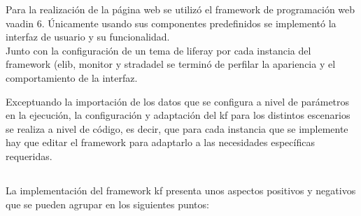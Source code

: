 Para la realización de la página web se utilizó el \gls{framework} de programación web  \gls{vaadin} 6. Únicamente usando sus componentes predefinidos se implementó la interfaz de usuario y su funcionalidad.\\

Junto con la configuración de un tema de \gls{liferay} por cada instancia del \gls{framework} (\gls{elib}, \gls{monitor} y \gls{strada}del se terminó de perfilar la apariencia y el comportamiento de la interfaz.

Exceptuando la importación de los datos que se configura a nivel de parámetros en la ejecución, la configuración y adaptación del \gls{kf} para los distintos escenarios se realiza a nivel de código, es decir, que para cada instancia que se implemente hay que editar el \gls{framework} para adaptarlo a las necesidades específicas requeridas.


\subsection{}
\begin{comment}
Esta sección debe contener información sobre los aspectos positivos y negativos del negocio actual de la organización para la que se va a desarrollar el sistema software.
\end{comment}
La implementación del \gls{framework} \gls{kf} presenta unos aspectos positivos y negativos que se pueden agrupar en los siguientes puntos:

